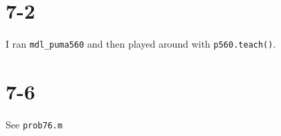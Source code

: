 \documentclass{../homework}
\begin{document}
\begin{problem}
\end{problem}

\begin{solution}
  \begin{parts}
    \part{7-2}
    I ran \texttt{mdl\_puma560} and then played around with \texttt{p560.teach()}.
    \part{7-6}
    See \texttt{prob76.m}
  \end{parts}
\end{solution}

\begin{problem}
\end{problem}
\end{document}
